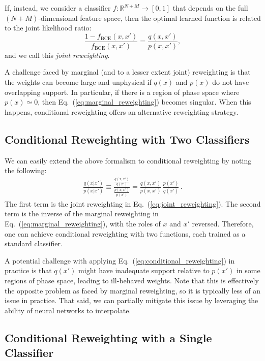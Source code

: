 \documentclass[aps,prx,reprint,preprintnumbers,superscriptaddress,nofootinbib,longbibliography,floatfix]{revtex4-2}
\DeclareRobustCommand{\Eq}[1]{Eq.~(\ref{eq:#1})}
\begin{document}
If, instead, we consider a classifier $f:\mathbb{R}^{N+M} \rightarrow [0,1]$ that depends on the full $(N+M)$-dimensional feature space, then the optimal learned function is related to the joint likelihood ratio:
%
\begin{equation}
    \label{eq:joint_reweighting}
    \frac{1-f_\text{BCE}(x,x')}{f_\text{BCE}(x,x')} = \frac{q(x,x')}{p(x,x')},
\end{equation}
%
and we call this \emph{joint reweighting}.


A challenge faced by marginal (and to a lesser extent joint) reweighting is that the weights can become large and unphysical if $q(x)$ and $p(x)$ do not have overlapping support.
%
In particular, if there is a region of phase space where $p(x) \simeq 0$, then \Eq{marginal_reweighting} becomes singular.
%
When this happens, conditional reweighting offers an alternative reweighting strategy.


\subsection{Conditional Reweighting with Two Classifiers}
\label{sec:cond_two}

We can easily extend the above formalism to conditional reweighting by noting the following:
%
\begin{align}
\label{eq:conditional_reweighting}
    \frac{q(x|x')}{p(x|x')} \equiv \frac{\frac{q(x,x')}{q(x')}}{\frac{p(x,x')}{p(x')}}=\frac{q(x,x')}{p(x,x')}\,\frac{p(x')}{q(x')}\,.
\end{align}
%
The first term is the joint reweighting in \Eq{joint_reweighting}.
%
The second term is the inverse of the marginal reweighting in \Eq{marginal_reweighting}, with the roles of $x$ and $x'$ reversed.
%
Therefore, one can achieve conditional reweighting with two functions, each trained as a standard classifier.


A potential challenge with applying \Eq{conditional_reweighting} in practice is that $q(x')$ might have inadequate support relative to $p(x')$ in some regions of phase space, leading to ill-behaved weights.
%
Note that this is effectively the opposite problem as faced by marginal reweighting, so it is typically less of an issue in practice.
%
That said, we can partially mitigate this issue by leveraging the ability of neural networks to interpolate.

\subsection{Conditional Reweighting with a Single Classifier}
\label{sec:ncr_single}
\end{document}
